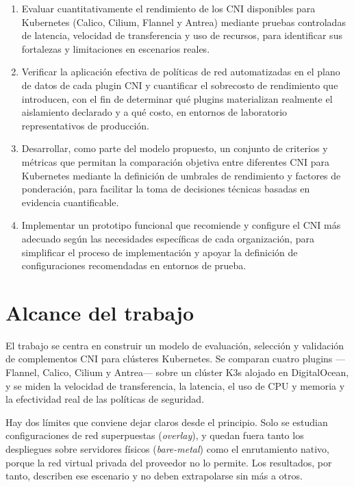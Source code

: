 \begin{enumerate}
  \item Evaluar cuantitativamente el rendimiento de los CNI disponibles para Kubernetes (Calico, Cilium, Flannel y Antrea) mediante pruebas controladas de latencia, velocidad de transferencia y uso de recursos, para identificar sus fortalezas y limitaciones en escenarios reales.
  \item Verificar la aplicación efectiva de políticas de red automatizadas en el plano de datos de cada plugin CNI y cuantificar el sobrecosto de rendimiento que introducen, con el fin de determinar qué plugins materializan realmente el aislamiento declarado y a qué costo, en entornos de laboratorio representativos de producción.
  \item Desarrollar, como parte del modelo propuesto, un conjunto de criterios y métricas que permitan la comparación objetiva entre diferentes CNI para Kubernetes mediante la definición de umbrales de rendimiento y factores de ponderación, para facilitar la toma de decisiones técnicas basadas en evidencia cuantificable.
  \item Implementar un prototipo funcional que recomiende y configure el CNI más adecuado según las necesidades específicas de cada organización, para simplificar el proceso de implementación y apoyar la definición de configuraciones recomendadas en entornos de prueba.
\end{enumerate}

\section{Alcance del trabajo}

El trabajo se centra en construir un modelo de evaluación, selección y validación de complementos CNI para clústeres Kubernetes. Se comparan cuatro plugins ---Flannel, Calico, Cilium y Antrea--- sobre un clúster K3s alojado en DigitalOcean, y se miden la velocidad de transferencia, la latencia, el uso de CPU y memoria y la efectividad real de las políticas de seguridad.

Hay dos límites que conviene dejar claros desde el principio. Solo se estudian configuraciones de red superpuestas (\emph{overlay}), y quedan fuera tanto los despliegues sobre servidores físicos (\emph{bare-metal}) como el enrutamiento nativo, porque la red virtual privada del proveedor no lo permite. Los resultados, por tanto, describen ese escenario y no deben extrapolarse sin más a otros.


